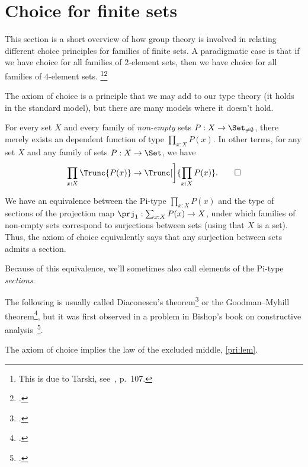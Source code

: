 \section{Choice for finite sets\titledagger}
\label{sec:choicefin}

This section is a short overview of how group theory is involved in
relating different choice principles for families of finite sets.  A
paradigmatic case is that if we have choice for all families of
$2$-element sets, then we have choice for all families of $4$-element
sets.%
\footnote{This is due to Tarski,
  see~\citeauthor{Jech-AC}\footnotemark{}, p.~107.}\footcitetext{Jech-AC}

The axiom of choice is a principle that we may add to our type theory
(it holds in the standard model), but there are many models where it doesn't hold.

\begin{principle}\label{pri:ac}
  For every set $X$ and every family of \emph{non-empty} sets
  $P : X \to \Set_{\ne\emptyset}$,
  there merely exists an dependent function of type $\prod_{x:X}P(x)$.
  In other terms, for any set $X$ and any family of sets $P:X\to\Set$,
  we have
  \begin{equation}\label{eq:ac-impl}
    \prod_{x:X}\Trunc{P(x)} \to \Trunc[\bigg]{\prod_{x:X}P(x)}.\qedhere
  \end{equation}
\end{principle}

\begin{remark}
  We have an equivalence between the Pi-type $\prod_{x:X}P(x)$ and the
  type of sections of the projection map $\prj_1 : \sum_{x:X}P(x) \to X$,
  under which families of non-empty sets correspond to surjections between sets
  (using that $X$ is a set).
  Thus, the axiom of choice equivalently says that any surjection
  between sets admits a section.

  Because of this equivalence, we'll sometimes also call elements of the
  Pi-type \emph{sections}.
\end{remark}

The following is usually called Diaconescu's theorem\footcite{Diaconescu} or the Goodman--Myhill theorem\footcite{Goodman-Myhill}, but it was first observed in a problem in Bishop's book on constructive analysis~\footcite{Bishop}.

\begin{theorem}
  The axiom of choice implies the law of the excluded middle, \cref{pri:lem}.
\end{theorem}

